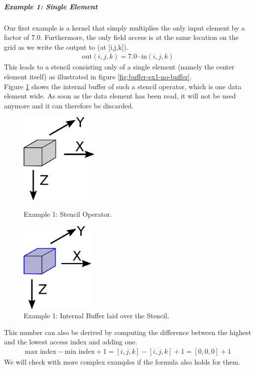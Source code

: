 \subparagraph{Example 1: Single Element}
Our first example is a kernel that simply multiplies the only input element by a factor of 7.0. Furthermore, the only field access is at the same location on the grid as we write the output to (at [i,j,k]). 
\begin{align}
\text{out}(i, j, k) = 7.0 \cdot \text{in}(i, j, k)
\end{align}
This leads to a stencil consisting only of a single element (namely the center element itself) as illustrated in figure \ref{fig:buffer-ex1-no-buffer}. \\
Figure \ref{fig:buffer-ex1-buffer} shows the internal buffer of such a stencil operator, which is one data element wide. As soon as the data element has been read, it will not be used anymore and it can therefore be discarded. \\
\begin{figure}[h]
	\begin{minipage}{.5\columnwidth}
		\centering
		\includegraphics[height=12em]{drawings/buffer-ex1-no-buffer.png}
		\caption{Example 1: Stencil Operator.}
		\label{fig:buffer-ex1-no-buffer}
	\end{minipage}
	\begin{minipage}{.5\columnwidth}
		\centering
		\includegraphics[height=12em]{drawings/buffer-ex1-buffer.png}
		\caption{Example 1: Internal Buffer laid over the Stencil.}
		\label{fig:buffer-ex1-buffer}
	\end{minipage}
\end{figure}

This number can also be derived by computing the difference between the highest and the lowest access index and adding one.
\begin{align}
\text{max index} - \text{min index} + 1 = [i, j, k] - [i, j, k] + 1 = [0, 0, 0] + 1
\end{align}
We will check with more complex examples if the formula also holds for them.\\


